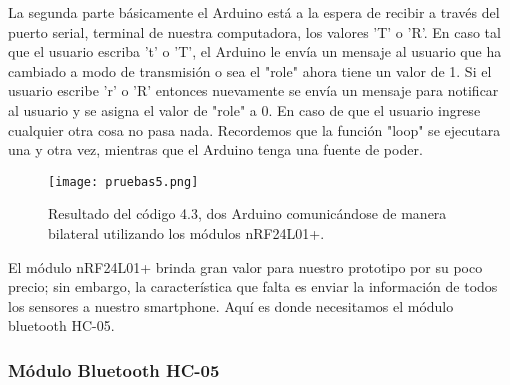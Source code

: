 \par \noindent
La segunda parte básicamente el Arduino está a la espera de recibir a través del puerto serial, terminal de nuestra computadora, los valores 'T' o 'R'. En caso tal que el usuario escriba 't' o 'T', el Arduino le envía un mensaje al usuario que ha cambiado a modo de transmisión o sea el "role" ahora tiene un valor de 1. Si el usuario escribe 'r' o 'R' entonces nuevamente se envía un mensaje para notificar al usuario y se asigna el valor de "role" a 0. En caso de que el usuario ingrese cualquier otra cosa no pasa nada. Recordemos que la función "loop" se ejecutara una y otra vez, mientras que el Arduino tenga una fuente de poder.

\begin{figure}[H]
	\centering
	\texttt{[image: pruebas5.png]}
	\caption{Resultado del código 4.3, dos Arduino comunicándose de manera bilateral utilizando los módulos nRF24L01+.}
\end{figure}

\par \noindent
El módulo nRF24L01+ brinda gran valor para nuestro prototipo por su poco precio; sin embargo, la característica que falta es enviar la información de todos los sensores a nuestro smartphone. Aquí es donde necesitamos el módulo bluetooth HC-05.  

\subsubsection{Módulo Bluetooth HC-05}
